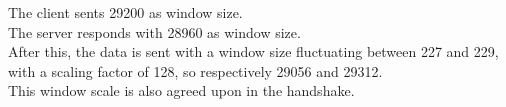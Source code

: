 The client sents 29200 as window size.\\
The server responds with 28960 as window size.\\
After this, the data is sent with a window size fluctuating between 227 and 229, with a scaling factor of 128, so respectively 29056 and 29312.\\
This window scale is also agreed upon in the handshake.